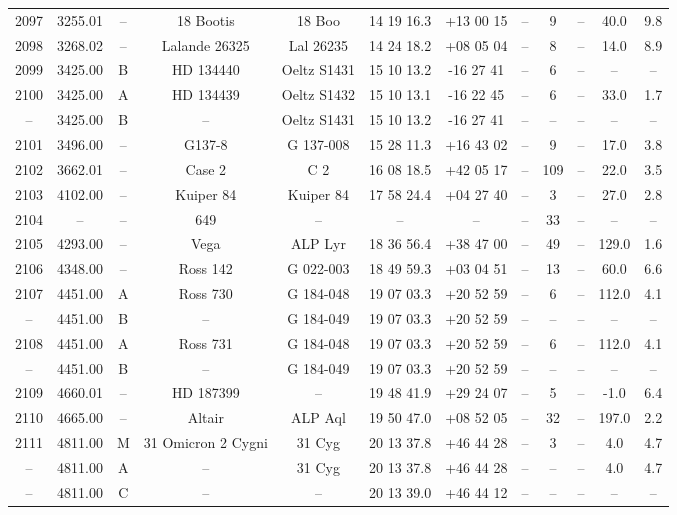 \begin{table}
\begin{tabular}{cccccccccccc}
2097 & 3255.01 & -- & 18 Bootis & 18 Boo & 14 19 16.3 & +13 00 15 & -- & 9 & -- & 40.0 & 9.8 \\
2098 & 3268.02 & -- & Lalande 26325 & Lal 26235 & 14 24 18.2 & +08 05 04 & -- & 8 & -- & 14.0 & 8.9 \\
2099 & 3425.00 & B & HD 134440 & Oeltz S1431 & 15 10 13.2 & -16 27 41 & -- & 6 & -- & -- & -- \\
2100 & 3425.00 & A & HD 134439 & Oeltz S1432 & 15 10 13.1 & -16 22 45 & -- & 6 & -- & 33.0 & 1.7 \\
-- & 3425.00 & B & -- & Oeltz S1431 & 15 10 13.2 & -16 27 41 & -- & -- & -- & -- & -- \\
2101 & 3496.00 & -- & G137-8 & G 137-008 & 15 28 11.3 & +16 43 02 & -- & 9 & -- & 17.0 & 3.8 \\
2102 & 3662.01 & -- & Case 2 & C 2 & 16 08 18.5 & +42 05 17 & -- & 109 & -- & 22.0 & 3.5 \\
2103 & 4102.00 & -- & Kuiper 84 & Kuiper 84 & 17 58 24.4 & +04 27 40 & -- & 3 & -- & 27.0 & 2.8 \\
2104 & -- & -- & 649 & -- & -- & -- & -- & 33 & -- & -- & -- \\
2105 & 4293.00 & -- & Vega & ALP Lyr & 18 36 56.4 & +38 47 00 & -- & 49 & -- & 129.0 & 1.6 \\
2106 & 4348.00 & -- & Ross 142 & G 022-003 & 18 49 59.3 & +03 04 51 & -- & 13 & -- & 60.0 & 6.6 \\
2107 & 4451.00 & A & Ross 730 & G 184-048 & 19 07 03.3 & +20 52 59 & -- & 6 & -- & 112.0 & 4.1 \\
-- & 4451.00 & B & -- & G 184-049 & 19 07 03.3 & +20 52 59 & -- & -- & -- & -- & -- \\
2108 & 4451.00 & A & Ross 731 & G 184-048 & 19 07 03.3 & +20 52 59 & -- & 6 & -- & 112.0 & 4.1 \\
-- & 4451.00 & B & -- & G 184-049 & 19 07 03.3 & +20 52 59 & -- & -- & -- & -- & -- \\
2109 & 4660.01 & -- & HD 187399 & -- & 19 48 41.9 & +29 24 07 & -- & 5 & -- & -1.0 & 6.4 \\
2110 & 4665.00 & -- & Altair & ALP Aql & 19 50 47.0 & +08 52 05 & -- & 32 & -- & 197.0 & 2.2 \\
2111 & 4811.00 & M & 31 Omicron 2 Cygni & 31 Cyg & 20 13 37.8 & +46 44 28 & -- & 3 & -- & 4.0 & 4.7 \\
-- & 4811.00 & A & -- & 31 Cyg & 20 13 37.8 & +46 44 28 & -- & -- & -- & 4.0 & 4.7 \\
-- & 4811.00 & C & -- & -- & 20 13 39.0 & +46 44 12 & -- & -- & -- & -- & -- \\

\end{tabular}
\end{table}
